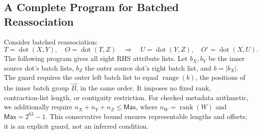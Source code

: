 \subsection{A Complete Program for Batched Reassociation}
\label{app:batched-reassociation-program}
Consider batched reassociation:
\begin{equation}
 T=\operatorname{dot}(X,Y),\quad O=\operatorname{dot}(T,Z)
 \quad\Rightarrow\quad
 U=\operatorname{dot}(Y,Z),\quad O'=\operatorname{dot}(X,U).
\end{equation}
The following program gives all eight RHS attribute lists. Let $b_X,b_Y$ be the inner source dot's batch lists,
$b_Z$ the outer source dot's right batch list, and $b=|b_X|$. The guard
requires the outer left batch list to equal $\operatorname{range}(b)$,
the positions of the inner batch group $\vec B$, in the same order. It imposes
no fixed rank, contraction-list length, or contiguity restriction.
For checked metadata arithmetic, we additionally require
$n_X+n_Y+n_Z\le\mathsf{Max}$, where $n_W=\operatorname{rank}(W)$ and
$\mathsf{Max}=2^{63}-1$. This conservative bound ensures representable
lengths and offsets; it is an explicit guard, not an inferred condition.

